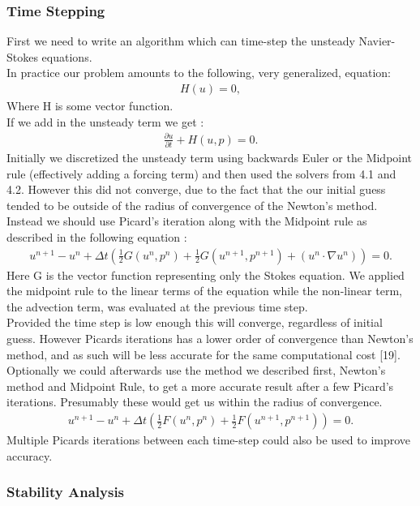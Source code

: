 \documentclass[11pt,twoside,a4paper]{article}
\begin{document}
\subsubsection{Time Stepping}
First we need to write an algorithm which can time-step the unsteady Navier-Stokes equations.\\
In practice our problem amounts to the following, very generalized, equation:
\begin{align*}
H(u) = 0 ,
\end{align*}
Where H is some vector function.\\
If we add in the unsteady term we get :
\begin{align}
\frac{\partial u}{\partial t} + H(u,p) = 0.
\end{align}
Initially we discretized the unsteady term using backwards Euler or the Midpoint rule (effectively adding a forcing term) and then used the solvers from 4.1 and 4.2. However this did not converge, due to the fact that the our initial guess tended to be outside of the radius of convergence of the Newton's method.\\
Instead we should use Picard's iteration along with the Midpoint rule as described in the following equation :
\begin{align}
u^{n+1} - u^n + \Delta t (\frac{1}{2}G(u^n,p^n) + \frac{1}{2} G(u^{n+1},p^{n+1}) + ( u^n \cdot \nabla u^n) ) = 0 .
\end{align}
Here G is the vector function representing only the Stokes equation. We applied the midpoint rule to the linear terms of the equation while the non-linear term, the advection term, was evaluated at the previous time step.\\
Provided the time step is low enough this will converge, regardless of initial guess. However Picards iterations has a lower order of convergence than Newton's method, and as such will be less accurate for the same computational cost [19].\\
Optionally we could afterwards use the method we described first, Newton's method and Midpoint Rule, to get a more accurate result after a few Picard's iterations. Presumably these would get us within the radius of convergence.
\begin{align}
u^{n+1} - u^n + \Delta t (\frac{1}{2}F(u^n,p^n) + \frac{1}{2} F(u^{n+1},p^{n+1})) = 0 .
\end{align}
Multiple Picards iterations between each time-step could also be used to improve accuracy.

\subsubsection{Stability Analysis}
\end{document}
